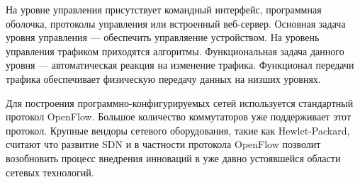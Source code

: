 На уровне управления присутствует командный интерфейс, программная оболочка, протоколы управления или встроенный веб-сервер.
Основная задача уровня управления --- обеспечить управляение устройством.
На уровень управления трафиком приходятся алгоритмы.
Функциональная задача данного уровня --- автоматическая реакция на изменение трафика.
Функционал передачи трафика обеспечивает физическую передачу данных на низших уровнях.

Для построения программно-конфигурируемых сетей используется стандартный протокол OpenFlow.
Большое количество коммутаторов уже поддерживает этот протокол.
Крупные вендоры сетевого оборудования, такие как Hewlet-Packard, считают что развитие SDN и в частности протокола OpenFlow позволит возобновить процесс внедрения инноваций в уже давно устоявшейся области сетевых технологий.

\clearpage
